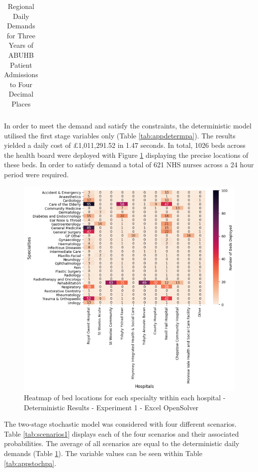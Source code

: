 \documentclass[../thesis.tex]{subfiles}
\begin{document}
\begin{table}[h!]
{\begin{tabular}{lcccccc}
    \end{tabular}}
    \caption{Regional Daily Demands for Three Years of ABUHB Patient Admissions to Four Decimal Places}
    \label{tab:regionaldemands1}
\end{table}





In order to meet the demand and satisfy the constraints, the deterministic model utilised the first stage variables only (Table \ref{tab:appdetermpa}). The results yielded a daily cost of $\pounds$1,011,291.52
 in 1.47 seconds. In total, 1026 beds across the health board were deployed with Figure \ref{fig:detHeatmap1} displaying the precise locations of these beds. In order to satisfy demand a total of 621 NHS nurses across a 24 hour period were required.


\begin{figure}[h!]
    \centering
    \includegraphics{Chapters/Chapter5/Figures/exdet.png}
    \caption{Heatmap of bed locations for each specialty within each hospital - Deterministic Results - Experiment 1 - Excel OpenSolver}
    \label{fig:detHeatmap1}
\end{figure}


The two-stage stochastic model was considered with four different scenarios. Table \ref{tab:scenarios1} displays each of the four scenarios and their associated probabilities. The average of all scenarios are equal to the deterministic daily demands (Table \ref{tab:regionaldemands1}). The variable values can be seen within Table \ref{tab:appstochpa}. 
\end{document}
